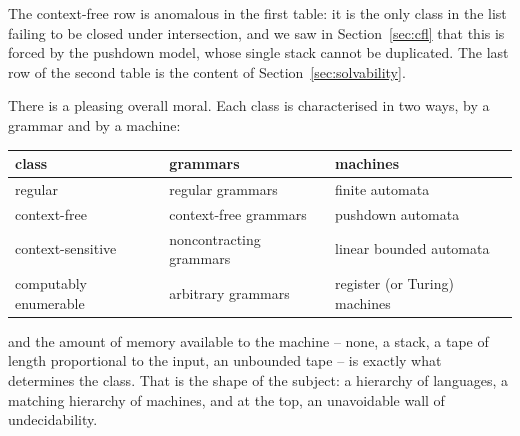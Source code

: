 \documentclass[a4paper]{scrartcl}
\begin{document}
The context-free row is anomalous in the first table: it is the only class in the list failing to be closed under intersection, and we saw in Section~\ref{sec:cfl} that this is forced by the pushdown model, whose single stack cannot be duplicated. The last row of the second table is the content of Section~\ref{sec:solvability}.

There is a pleasing overall moral. Each class is characterised in two ways, by a grammar and by a machine:
\begin{center}
	\begin{tabular}{l|l|l}
		class & grammars & machines \\\hline
		regular & regular grammars & finite automata \\
		context-free & context-free grammars & pushdown automata \\
		context-sensitive & noncontracting grammars & linear bounded automata \\
		computably enumerable & arbitrary grammars & register (or Turing) machines
	\end{tabular}
\end{center}
and the amount of memory available to the machine -- none, a stack, a tape of length proportional to the input, an unbounded tape -- is exactly what determines the class. That is the shape of the subject: a hierarchy of languages, a matching hierarchy of machines, and at the top, an unavoidable wall of undecidability.
\end{document}

